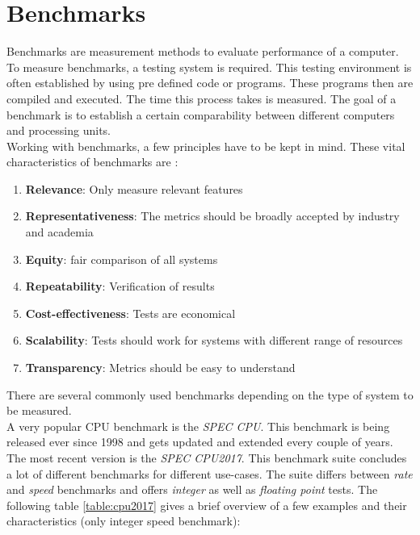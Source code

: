 \section{Benchmarks}
Benchmarks are measurement methods to evaluate performance of a computer. To measure benchmarks, a testing system is required. This testing environment is often established by using pre defined code or programs. These programs then are compiled and executed. The time this process takes is measured. The goal of a benchmark is to establish a certain comparability between different computers and processing units. \cite{gessler2014}\\
Working with benchmarks, a few principles have to be kept in mind. These vital characteristics of benchmarks are \cite{kounev2020systems}:
\begin{enumerate}
	\item \textbf{Relevance}: Only measure relevant features
	\item \textbf{Representativeness}: The metrics should be broadly accepted by industry and academia
	\item \textbf{Equity}: fair comparison of all systems
	\item \textbf{Repeatability}: Verification of results
	\item \textbf{Cost-effectiveness}: Tests are economical
	\item \textbf{Scalability}: Tests should work for systems with different range of resources
	\item \textbf{Transparency}: Metrics should be easy to understand
\end{enumerate}
There are several commonly used benchmarks depending on the type of system to be measured.\\
A very popular \ac{CPU} benchmark is the \textit{SPEC CPU}. This benchmark is being released ever since 1998 and gets updated and extended every couple of years. The most recent version is the \textit{SPEC CPU2017}. This benchmark suite concludes a lot of different benchmarks for different use-cases. The suite differs between \textit{rate} and \textit{speed} benchmarks and offers \textit{integer} as well as \textit{floating point} tests. The following table \ref{table:cpu2017} gives a brief overview of a few examples and their characteristics (only integer speed benchmark):
\begin{table}[H]
	\setlength\arrayrulewidth{2pt}
	\centering
	\caption{SPEC CPU2017 benchmark suite \cite{kounev2020systems}}
	\label{table:cpu2017}
\end{table}

